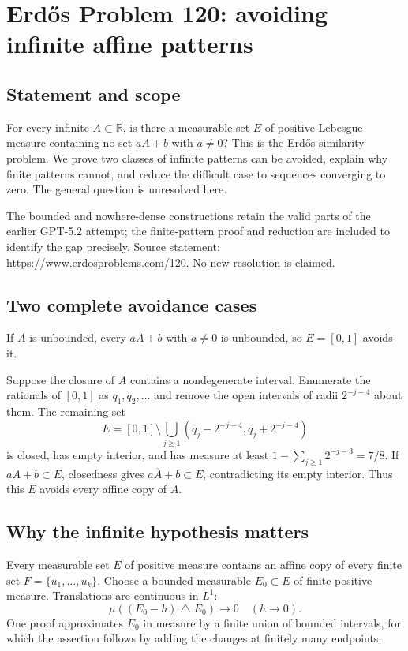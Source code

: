 \section*{Erd\H{o}s Problem 120: avoiding infinite affine patterns}
\subsection*{Statement and scope}
For every infinite $A\subset\mathbb R$, is there a measurable set $E$ of positive Lebesgue measure containing no set $aA+b$ with $a\ne0$? This is the Erd\H{o}s similarity problem. We prove two classes of infinite patterns can be avoided, explain why finite patterns cannot, and reduce the difficult case to sequences converging to zero. The general question is unresolved here.

The bounded and nowhere-dense constructions retain the valid parts of the earlier GPT-5.2 attempt; the finite-pattern proof and reduction are included to identify the gap precisely. Source statement: \url{https://www.erdosproblems.com/120}. No new resolution is claimed.

\subsection*{Two complete avoidance cases}
If $A$ is unbounded, every $aA+b$ with $a\ne0$ is unbounded, so $E=[0,1]$ avoids it.

Suppose the closure of $A$ contains a nondegenerate interval. Enumerate the rationals of $[0,1]$ as $q_1,q_2,\ldots$ and remove the open intervals of radii $2^{-j-4}$ about them. The remaining set
\[
 E=[0,1]\setminus\bigcup_{j\ge1}(q_j-2^{-j-4},q_j+2^{-j-4})
\]
is closed, has empty interior, and has measure at least $1-\sum_{j\ge1}2^{-j-3}=7/8$. If $aA+b\subset E$, closedness gives $a\overline A+b\subset E$, contradicting its empty interior. Thus this $E$ avoids every affine copy of $A$.

\subsection*{Why the infinite hypothesis matters}
Every measurable set $E$ of positive measure contains an affine copy of every finite set $F=\{u_1,\ldots,u_k\}$. Choose a bounded measurable $E_0\subset E$ of finite positive measure. Translations are continuous in $L^1$:
\[
 \mu((E_0-h)\mathbin{\triangle}E_0)\longrightarrow0\quad(h\to0).
\]
One proof approximates $E_0$ in measure by a finite union of bounded intervals, for which the assertion follows by adding the changes at finitely many endpoints.

